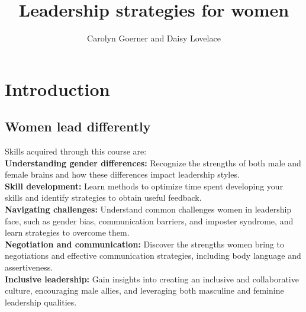 \documentclass[12pt]{article}
\begin{document}

\title{\textbf{Leadership strategies for women}}
\author{ Carolyn Goerner and Daisy Lovelace}
\maketitle

\newpage
\tableofcontents
\newpage

\newpage
\section{Introduction}

\subsection{Women lead differently}
Skills acquired through this course are:\\
\textbf{Understanding gender differences:} Recognize the strengths of both male and female brains and how these differences impact leadership styles.\\
\textbf{Skill development:} Learn methods to optimize time spent developing your skills and identify strategies to obtain useful feedback.\\
\textbf{Navigating challenges:} Understand common challenges women in leadership face, such as gender bias, communication barriers, and imposter syndrome, and learn strategies to overcome them.\\
\textbf{Negotiation and communication:} Discover the strengths women bring to negotiations and effective communication strategies, including body language and assertiveness.\\
\textbf{Inclusive leadership:} Gain insights into creating an inclusive and collaborative culture, encouraging male allies, and leveraging both masculine and feminine leadership qualities.\\

\end{document}
